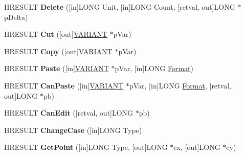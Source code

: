 \begin{DoxyCompactItemize}
\item 
\mbox{\label{interface_i_text_range_a7f2c30199828f64bced1682c6a90d478}} 
H\+R\+E\+S\+U\+LT {\bfseries Delete} (\mbox{[}in\mbox{]}L\+O\+NG Unit, \mbox{[}in\mbox{]}L\+O\+NG Count, \mbox{[}retval, out\mbox{]}L\+O\+NG $\ast$p\+Delta)
\item 
\mbox{\label{interface_i_text_range_ae847da698911bf9b52daf62f75b65c23}} 
H\+R\+E\+S\+U\+LT {\bfseries Cut} (\mbox{[}out\mbox{]}\hyperlink{structtag_v_a_r_i_a_n_t}{V\+A\+R\+I\+A\+NT} $\ast$p\+Var)
\item 
\mbox{\label{interface_i_text_range_a122fb2ac0951d077aeab3983653f8743}} 
H\+R\+E\+S\+U\+LT {\bfseries Copy} (\mbox{[}out\mbox{]}\hyperlink{structtag_v_a_r_i_a_n_t}{V\+A\+R\+I\+A\+NT} $\ast$p\+Var)
\item 
\mbox{\label{interface_i_text_range_a8e519a2858f515744f7a74f0208bca3a}} 
H\+R\+E\+S\+U\+LT {\bfseries Paste} (\mbox{[}in\mbox{]}\hyperlink{structtag_v_a_r_i_a_n_t}{V\+A\+R\+I\+A\+NT} $\ast$p\+Var, \mbox{[}in\mbox{]}L\+O\+NG \hyperlink{struct_format}{Format})
\item 
\mbox{\label{interface_i_text_range_a2aa42dd8cfe49a2dfecbeece9be7a7cd}} 
H\+R\+E\+S\+U\+LT {\bfseries Can\+Paste} (\mbox{[}in\mbox{]}\hyperlink{structtag_v_a_r_i_a_n_t}{V\+A\+R\+I\+A\+NT} $\ast$p\+Var, \mbox{[}in\mbox{]}L\+O\+NG \hyperlink{struct_format}{Format}, \mbox{[}retval, out\mbox{]}L\+O\+NG $\ast$pb)
\item 
\mbox{\label{interface_i_text_range_ae8713922ad34101fe44244fcfe795062}} 
H\+R\+E\+S\+U\+LT {\bfseries Can\+Edit} (\mbox{[}retval, out\mbox{]}L\+O\+NG $\ast$pb)
\item 
\mbox{\label{interface_i_text_range_a61b4d41e6731aa3dcd6aeb5985c724ad}} 
H\+R\+E\+S\+U\+LT {\bfseries Change\+Case} (\mbox{[}in\mbox{]}L\+O\+NG Type)
\item 
\mbox{\label{interface_i_text_range_a9422013e829b5355a3f6c495c50c2992}} 
H\+R\+E\+S\+U\+LT {\bfseries Get\+Point} (\mbox{[}in\mbox{]}L\+O\+NG Type, \mbox{[}out\mbox{]}L\+O\+NG $\ast$cx, \mbox{[}out\mbox{]}L\+O\+NG $\ast$cy)

\end{DoxyCompactItemize}
